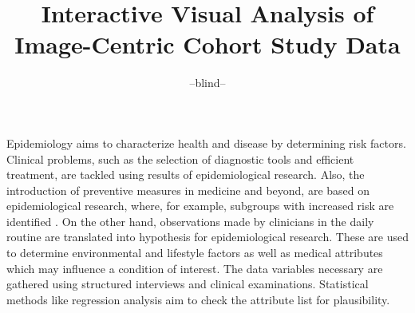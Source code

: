 \documentclass[journal]{style/vgtc} 			          %
\title{Interactive Visual Analysis of Image-Centric Cohort Study Data}
\author{--blind--}
\begin{document}


\maketitle

Epidemiology aims to characterize health and disease by determining risk factors.
%
Clinical problems, such as the selection of diagnostic tools and efficient treatment, are tackled using results of epidemiological research.
%
Also, the introduction of preventive measures in medicine and beyond, are based on epidemiological research, where, for example, subgroups with increased risk are identified \cite{Fletcher2012}.
%
On the other hand, observations made by clinicians in the daily routine are translated into hypothesis for epidemiological research.
%
These are used to determine environmental and lifestyle factors as well as medical attributes which may influence a condition of interest.
%
The data variables necessary are gathered using structured interviews and clinical examinations.
%
Statistical methods like regression analysis aim to check the attribute list for plausibility.
%
\end{document}
